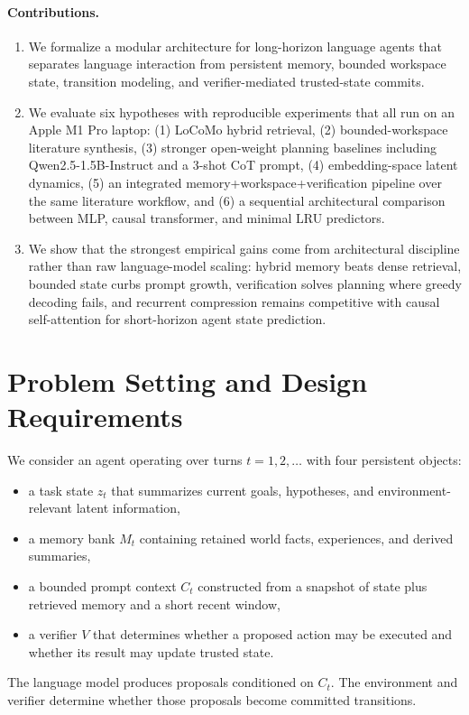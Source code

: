 \documentclass[11pt]{article}
\begin{document}
\paragraph{Contributions.}
\begin{enumerate}
    \item We formalize a modular architecture for long-horizon language agents that separates language interaction from persistent memory, bounded workspace state, transition modeling, and verifier-mediated trusted-state commits.
    \item We evaluate six hypotheses with reproducible experiments that all run on an Apple M1 Pro laptop: (1) LoCoMo hybrid retrieval, (2) bounded-workspace literature synthesis, (3) stronger open-weight planning baselines including Qwen2.5-1.5B-Instruct and a 3-shot CoT prompt, (4) embedding-space latent dynamics, (5) an integrated memory+workspace+verification pipeline over the same literature workflow, and (6) a sequential architectural comparison between MLP, causal transformer, and minimal LRU predictors.
    \item We show that the strongest empirical gains come from architectural discipline rather than raw language-model scaling: hybrid memory beats dense retrieval, bounded state curbs prompt growth, verification solves planning where greedy decoding fails, and recurrent compression remains competitive with causal self-attention for short-horizon agent state prediction.
\end{enumerate}

\section{Problem Setting and Design Requirements}
We consider an agent operating over turns $t = 1, 2, \ldots$ with four persistent objects:
\begin{itemize}
    \item a task state $z_t$ that summarizes current goals, hypotheses, and environment-relevant latent information,
    \item a memory bank $M_t$ containing retained world facts, experiences, and derived summaries,
    \item a bounded prompt context $C_t$ constructed from a snapshot of state plus retrieved memory and a short recent window,
    \item a verifier $V$ that determines whether a proposed action may be executed and whether its result may update trusted state.
\end{itemize}
The language model produces proposals conditioned on $C_t$. The environment and verifier determine whether those proposals become committed transitions.
\end{document}
